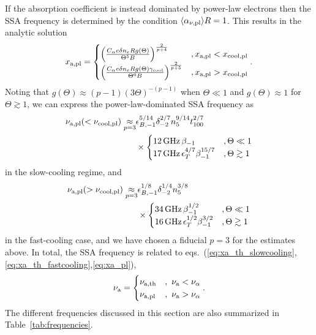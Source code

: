 \documentclass[twocolumn]{aastex63}
\begin{document}
If the absorption coefficient is instead dominated by power-law electrons then the SSA frequency is determined by the condition $\langle \alpha_{\nu,{\rm pl}} \rangle R = 1$. This results in the analytic solution
\begin{equation}
\label{eq:xa_pl}
    x_{\rm a, pl}
    = 
    \begin{cases}
    \left( \frac{C_\alpha e \delta n_e R g\left(\Theta\right)}{\Theta^5 B} \right)^\frac{2}{p+4}
    &,x_{\rm a, pl}<x_{\rm cool,pl}
    \\
    \left( \frac{C_\alpha e \delta n_e R g\left(\Theta\right) \gamma_{\rm cool}}{\Theta^6 B} \right)^\frac{2}{p+5}
    &,x_{\rm a, pl}>x_{\rm cool,pl}
    \end{cases}
    .
\end{equation}
Noting that $g(\Theta) \approx (p-1) (3\Theta)^{-(p-1)}$ when $\Theta \ll 1$ and $g(\Theta) \approx 1$ for $\Theta \gtrsim 1$, we can express the power-law-dominated SSA frequency as
\begin{align}
    \nu_{\rm a,pl}(<\nu_{\rm cool,pl})
    \underset{p=3}{\approx}
    &\epsilon_{B,-1}^{5/14} \delta_{-2}^{2/7} n_5^{9/14} t_{100}^{2/7}
    \\ \nonumber
    &\times
    \begin{cases}
    12\,{\rm GHz}\, \beta_{-1} 
    &, \Theta \ll 1
    \\
    17\,{\rm GHz}\, 
    \epsilon_T^{4/7}  \beta_{-1}^{15/7}
    &, \Theta \gtrsim 1
    \end{cases}
\end{align}
in the slow-cooling regime, and
\begin{align}
    \nu_{\rm a,pl}(>\nu_{\rm cool,pl})
    \underset{p=3}{\approx}
    &\epsilon_{B,-1}^{1/8} \delta_{-2}^{1/4} n_5^{3/8}
    \\ \nonumber
    &\times
    \begin{cases}
    34\,{\rm GHz}\, \beta_{-1}^{1/2}
    &, \Theta \ll 1
    \\
    16\,{\rm GHz}\, \epsilon_T^{1/2}  \beta_{-1}^{3/2}
    &, \Theta \gtrsim 1
    \end{cases}
\end{align}
in the fast-cooling case, and we have chosen a fiducial $p=3$ for the estimates above.
In total, the SSA frequency is related to eqs.~(\ref{eq:xa_th_slowcooling},\ref{eq:xa_th_fastcooling},\ref{eq:xa_pl}),
\begin{equation}
\label{eq:nu_a}
    \nu_{\rm a} = 
    \begin{cases}
    \nu_{\rm a, th} &,~ \nu_{\rm a} < \nu_\alpha
    \\
    \nu_{\rm a, pl} &,~ \nu_{\rm a} > \nu_\alpha
    \end{cases}
    .
\end{equation}
The different frequencies discussed in this section are also summarized in Table~\ref{tab:frequencies}.
\end{document}

